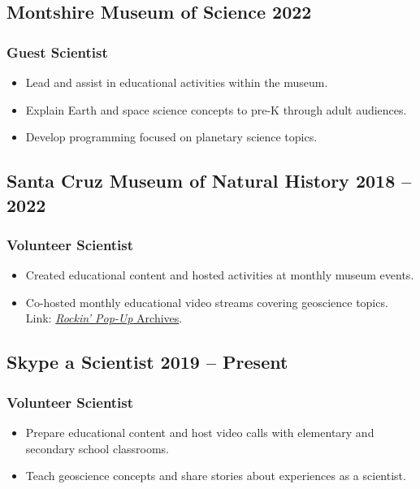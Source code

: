 \documentclass[10pt]{article}
\begin{document}
\subsection*{\textbf{Montshire Museum of Science} \hfill 2022}
\subsubsection*{Guest Scientist}
\begin{itemize}
\item Lead and assist in educational activities within the museum.
\item Explain Earth and space science concepts to pre-K through adult audiences.
\item Develop programming focused on planetary science topics.
\end{itemize}

\subsection*{\textbf{Santa Cruz Museum of Natural History} \hfill 2018 – 2022}
\subsubsection*{Volunteer Scientist}
\begin{itemize}
	\item Created educational content and hosted activities at monthly museum events.
	\item Co-hosted monthly educational video streams covering geoscience topics. \\
	Link: \href{https://www.santacruzmuseum.org/category/rockin-pop-up/}{\emph{Rockin' Pop-Up} Archives}.
\end{itemize}

\subsection*{\textbf{Skype a Scientist} \hfill 2019 – Present}
\subsubsection*{Volunteer Scientist}
\begin{itemize}
	\item Prepare educational content and host video calls with elementary and secondary school classrooms.
	\item Teach geoscience concepts and share stories about experiences as a scientist.
\end{itemize}
\end{document}
